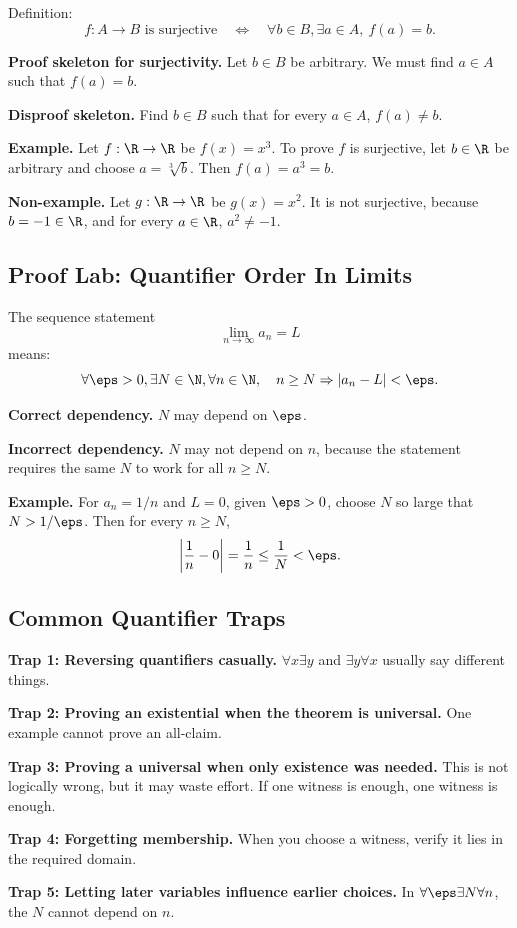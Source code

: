 \begin{labbox}
Definition:
\[
f:A\to B\text{ is surjective}
\quad\Longleftrightarrow\quad
\forall b\in B,\exists a\in A,\ f(a)=b.
\]

\textbf{Proof skeleton for surjectivity.}
Let $b\in B$ be arbitrary. We must find $a\in A$ such that $f(a)=b$.

\textbf{Disproof skeleton.}
Find $b\in B$ such that for every $a\in A$, $f(a)\neq b$.

\textbf{Example.}
Let $f:\R\to\R$ be $f(x)=x^3$. To prove $f$ is surjective, let $b\in\R$ be arbitrary and choose $a=\sqrt[3]{b}$. Then $f(a)=a^3=b$.

\textbf{Non-example.}
Let $g:\R\to\R$ be $g(x)=x^2$. It is not surjective, because $b=-1\in\R$, and for every $a\in\R$, $a^2\neq-1$.
\end{labbox}

\subsection{Proof Lab: Quantifier Order In Limits}

\begin{labbox}
The sequence statement
\[
\lim_{n\to\infty}a_n=L
\]
means:
\[
\forall \eps>0,\exists N\in\N,\forall n\in\N,\quad n\geq N\Rightarrow |a_n-L|<\eps.
\]

\textbf{Correct dependency.}
$N$ may depend on $\eps$.

\textbf{Incorrect dependency.}
$N$ may not depend on $n$, because the statement requires the same $N$ to work for all $n\geq N$.

\textbf{Example.}
For $a_n=1/n$ and $L=0$, given $\eps>0$, choose $N$ so large that $N>1/\eps$. Then for every $n\geq N$,
\[
\left|\frac1n-0\right|=\frac1n\leq \frac1N<\eps.
\]
\end{labbox}

\subsection{Common Quantifier Traps}

\begin{trapbox}
\textbf{Trap 1: Reversing quantifiers casually.}
$\forall x\exists y$ and $\exists y\forall x$ usually say different things.

\textbf{Trap 2: Proving an existential when the theorem is universal.}
One example cannot prove an all-claim.

\textbf{Trap 3: Proving a universal when only existence was needed.}
This is not logically wrong, but it may waste effort. If one witness is enough, one witness is enough.

\textbf{Trap 4: Forgetting membership.}
When you choose a witness, verify it lies in the required domain.

\textbf{Trap 5: Letting later variables influence earlier choices.}
In $\forall\eps\exists N\forall n$, the $N$ cannot depend on $n$.
\end{trapbox}

